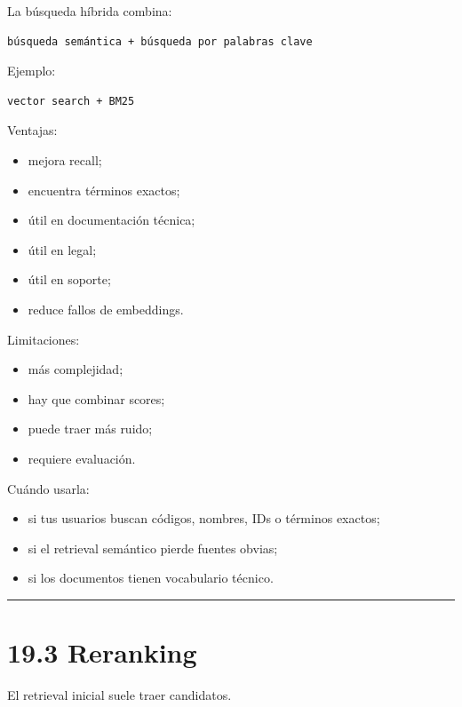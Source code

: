 La búsqueda híbrida combina:

\begin{lstlisting}
búsqueda semántica + búsqueda por palabras clave
\end{lstlisting}

Ejemplo:

\begin{lstlisting}
vector search + BM25
\end{lstlisting}

Ventajas:

\begin{itemize}
\tightlist
\item
  mejora recall;
\item
  encuentra términos exactos;
\item
  útil en documentación técnica;
\item
  útil en legal;
\item
  útil en soporte;
\item
  reduce fallos de embeddings.
\end{itemize}

Limitaciones:

\begin{itemize}
\tightlist
\item
  más complejidad;
\item
  hay que combinar scores;
\item
  puede traer más ruido;
\item
  requiere evaluación.
\end{itemize}

Cuándo usarla:

\begin{itemize}
\tightlist
\item
  si tus usuarios buscan códigos, nombres, IDs o términos exactos;
\item
  si el retrieval semántico pierde fuentes obvias;
\item
  si los documentos tienen vocabulario técnico.
\end{itemize}

\begin{center}\rule{0.5\linewidth}{0.5pt}\end{center}

\section{19.3 Reranking}\label{reranking-2}

El retrieval inicial suele traer candidatos.

